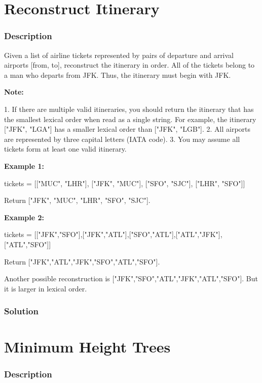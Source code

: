 \newpage

\section{Reconstruct Itinerary} %

\subsubsection{Description}
Given a list of airline tickets represented by pairs of departure and arrival airports [from, to], reconstruct the itinerary in order. All of the tickets belong to a man who departs from JFK. Thus, the itinerary must begin with JFK.

\textbf{Note:}

1. If there are multiple valid itineraries, you should return the itinerary that has the smallest lexical order when read as a single string. For example, the itinerary ["JFK", "LGA"] has a smaller lexical order than ["JFK", "LGB"].
2. All airports are represented by three capital letters (IATA code).
3. You may assume all tickets form at least one valid itinerary.

\textbf{Example 1:}

tickets = [["MUC", "LHR"], ["JFK", "MUC"], ["SFO", "SJC"], ["LHR", "SFO"]]

Return ["JFK", "MUC", "LHR", "SFO", "SJC"].

\textbf{Example 2:}

tickets = [["JFK","SFO"],["JFK","ATL"],["SFO","ATL"],["ATL","JFK"],["ATL","SFO"]]

Return ["JFK","ATL","JFK","SFO","ATL","SFO"].

Another possible reconstruction is ["JFK","SFO","ATL","JFK","ATL","SFO"]. But it is larger in lexical order.

\subsubsection{Solution}

\begin{Code}

\end{Code}

\newpage

\section{Minimum Height Trees} %
\subsubsection{Description}

